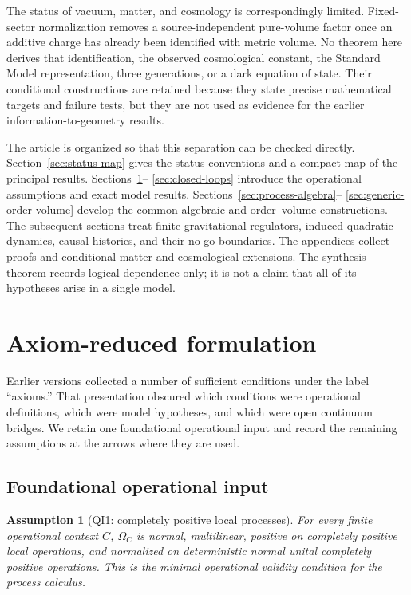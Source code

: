 \documentclass[11pt]{article}
\newtheorem{assumption}[theorem]{Assumption}
\begin{document}
The status of vacuum, matter, and cosmology is correspondingly limited.
Fixed-sector normalization removes a source-independent pure-volume factor
once an additive charge has already been identified with metric volume.
No theorem here derives that identification, the observed cosmological
constant, the Standard Model representation, three generations, or a dark
equation of state.  Their conditional constructions are retained because
they state precise mathematical targets and failure tests, but they are not
used as evidence for the earlier information-to-geometry results.

The article is organized so that this separation can be checked directly.
Section~\ref{sec:status-map} gives the status conventions and a compact map of
the principal results.  Sections~\ref{sec:v62-axiom-reduction}--%
\ref{sec:closed-loops} introduce the operational assumptions and exact model
results.  Sections~\ref{sec:process-algebra}--%
\ref{sec:generic-order-volume} develop the common algebraic and
order--volume constructions.  The subsequent sections treat finite
gravitational regulators, induced quadratic dynamics, causal histories, and
their no-go boundaries.  The appendices collect proofs and conditional
matter and cosmological extensions.  The synthesis theorem records logical
dependence only; it is not a claim that all of its hypotheses arise in a
single model.



\section{Axiom-reduced formulation}\label{sec:v62-axiom-reduction}

Earlier versions collected a number of sufficient conditions under the label
``axioms.''  That presentation obscured which conditions were operational
definitions, which were model hypotheses, and which were open continuum
bridges.  We retain one foundational operational input and record the
remaining assumptions at the arrows where they are used.

\subsection{Foundational operational input}

\begin{assumption}[QI1: completely positive local processes]\label{ass:qi1}
For every finite operational context $C$, $\Omega_C$ is normal, multilinear, positive on completely positive local operations, and normalized on deterministic normal unital completely positive operations.  This is the minimal operational validity condition for the process calculus.
\end{assumption}
\end{document}
